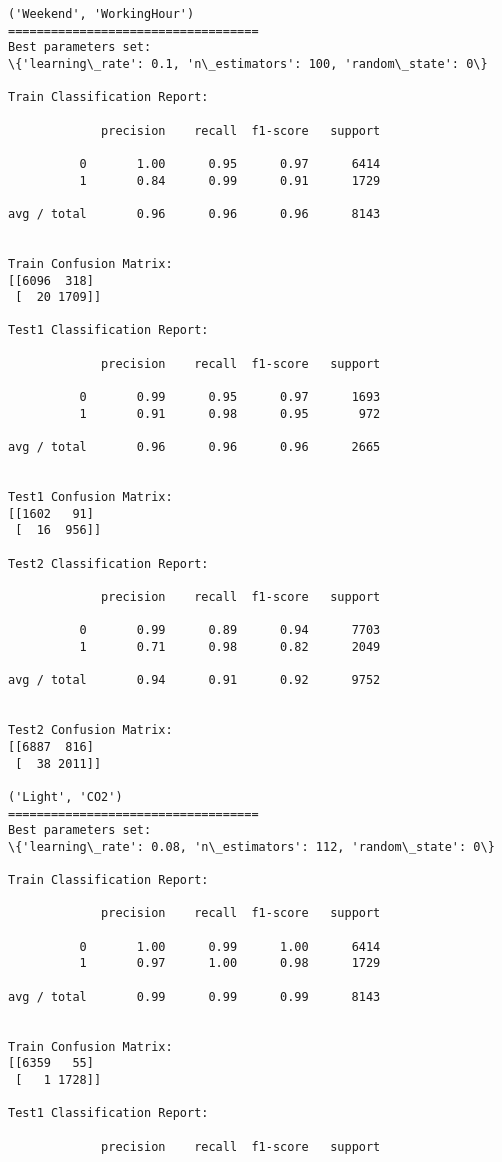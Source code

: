 \documentclass[11pt]{article}
\begin{document}
    \begin{Verbatim}[commandchars=\\\{\}]
('Weekend', 'WorkingHour')
===================================
Best parameters set:
\{'learning\_rate': 0.1, 'n\_estimators': 100, 'random\_state': 0\}

Train Classification Report:

             precision    recall  f1-score   support

          0       1.00      0.95      0.97      6414
          1       0.84      0.99      0.91      1729

avg / total       0.96      0.96      0.96      8143


Train Confusion Matrix:
[[6096  318]
 [  20 1709]]

Test1 Classification Report:

             precision    recall  f1-score   support

          0       0.99      0.95      0.97      1693
          1       0.91      0.98      0.95       972

avg / total       0.96      0.96      0.96      2665


Test1 Confusion Matrix:
[[1602   91]
 [  16  956]]

Test2 Classification Report:

             precision    recall  f1-score   support

          0       0.99      0.89      0.94      7703
          1       0.71      0.98      0.82      2049

avg / total       0.94      0.91      0.92      9752


Test2 Confusion Matrix:
[[6887  816]
 [  38 2011]]

('Light', 'CO2')
===================================
Best parameters set:
\{'learning\_rate': 0.08, 'n\_estimators': 112, 'random\_state': 0\}

Train Classification Report:

             precision    recall  f1-score   support

          0       1.00      0.99      1.00      6414
          1       0.97      1.00      0.98      1729

avg / total       0.99      0.99      0.99      8143


Train Confusion Matrix:
[[6359   55]
 [   1 1728]]

Test1 Classification Report:

             precision    recall  f1-score   support


\end{Verbatim}
\end{document}
